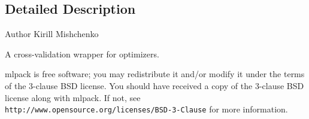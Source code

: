 \subsection{Detailed Description}
\begin{DoxyAuthor}{Author}
Kirill Mishchenko
\end{DoxyAuthor}
A cross-\/validation wrapper for optimizers.

mlpack is free software; you may redistribute it and/or modify it under the terms of the 3-\/clause B\+SD license. You should have received a copy of the 3-\/clause B\+SD license along with mlpack. If not, see {\tt http\+://www.\+opensource.\+org/licenses/\+B\+S\+D-\/3-\/\+Clause} for more information. 